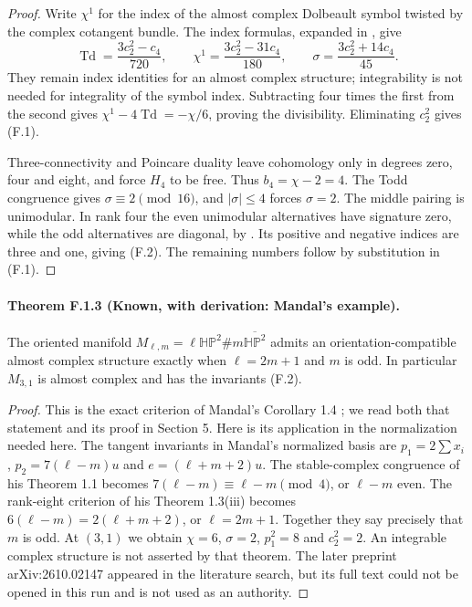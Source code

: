 \begin{proof}
Write $\chi^1$ for the index of the almost complex Dolbeault
symbol twisted by the complex cotangent bundle.  The index
formulas, expanded in \cite[(1.2)--(1.4)]{ffEsoleKang}, give
\[
 \operatorname{Td}=\frac{3c_2^2-c_4}{720},\qquad
 \chi^1=\frac{3c_2^2-31c_4}{180},\qquad
 \sigma=\frac{3c_2^2+14c_4}{45}.
\]
They remain index identities for an almost complex structure;
integrability is not needed for integrality of the symbol index.
Subtracting four times the first from the second gives
$\chi^1-4\operatorname{Td}=-\chi/6$, proving the divisibility.
Eliminating $c_2^2$ gives (F.1).

Three-connectivity and Poincare duality leave cohomology only
in degrees zero, four and eight, and force $H_4$ to be free.
Thus $b_4=\chi-2=4$.  The Todd congruence gives
$\sigma\equiv2\pmod{16}$, and $|\sigma|\leq4$ forces
$\sigma=2$.  The middle pairing is unimodular.  In rank four
the even unimodular alternatives have signature zero, while
the odd alternatives are diagonal, by
\cite[Theorem 2.2.1]{ffPetersSterk}.  Its positive and negative
indices are three and one, giving (F.2).  The remaining numbers
follow by substitution in (F.1).
\end{proof}

\paragraph{Theorem F.1.3 (Known, with derivation: Mandal's example).}
The oriented manifold
$M_{\ell,m}=\ell\mathbb{HP}^2\#m\overline{\mathbb{HP}^2}$
admits an orientation-compatible almost complex structure exactly
when $\ell=2m+1$ and $m$ is odd.  In particular $M_{3,1}$ is
almost complex and has the invariants (F.2).

\begin{proof}
This is the exact criterion of Mandal's Corollary 1.4
\cite{ffMandal}; we read both that statement and its proof in
Section 5.  Here is its application in the normalization needed
here.  The tangent invariants in Mandal's normalized basis are
$p_1=2\sum x_i$, $p_2=7(\ell-m)u$ and
$e=(\ell+m+2)u$.  The stable-complex congruence of his
Theorem 1.1 becomes
$7(\ell-m)\equiv\ell-m\pmod4$, or $\ell-m$ even.
The rank-eight criterion of his Theorem 1.3(iii) becomes
$6(\ell-m)=2(\ell+m+2)$, or $\ell=2m+1$.
Together they say precisely that $m$ is odd.  At $(3,1)$ we
obtain $\chi=6$, $\sigma=2$, $p_1^2=8$ and $c_2^2=2$.
An integrable complex structure is not asserted by that theorem.
The later preprint arXiv:2610.02147 appeared in the literature
search, but its full text could not be opened in this run and
is not used as an authority.
\end{proof}

